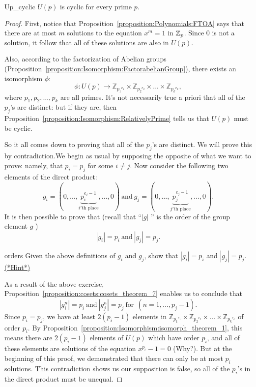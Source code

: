 \begin{prop}{Up_cyclic}
$U(p)$ is cyclic for every prime $p$.
\end {prop}
\begin{proof}
First, notice that Proposition~\ref{proposition:Polynomials:FTOA} says that there are at most $m$ solutions to the equation $x^m = 1$ in $\mathbb{Z}_p$. Since 0 is not a solution, it follow that all of these solutions are also in $U(p)$.

Also, according to the factorization of Abelian groups (Proposition~\ref{proposition:Isomorphism:FactorabelianGroup}), there exists an isomorphism $\phi$:
\[\phi: U(p)  \rightarrow {\mathbb{Z}_{{p_1}^{e_1}}}  \times   {\mathbb{Z}_{{p_2}^{e_2}}}  \times  ... \times   {\mathbb{Z}_{{p_k}^{e_k}}}, \]
where $p_1, p_2, \ldots, p_k$ are all primes.  It's not necessarily true a priori  that all of the $p_j$'s are distinct: but if they are, then Proposition~\ref{proposition:Isomorphism:RelativelyPrime} tells us that $U(p)$ must be cyclic. 

So it all comes down to proving that all of the $p_j$'s are distinct. We will prove this by contradiction.We begin as usual by supposing the opposite of what we want to prove: namely, that $p_i = p_j$ for some $i \neq j$. 
Now consider the following two elements of the direct product:
\[
g_i = ( 0, \ldots , \underbrace{p_i^{e_i-1}}_{i'\text{th place}}, \ldots,0) \mathrm{~ and ~} g_j = ( 0, \ldots , \underbrace{p_j^{e_j-1}}_{j'\text{th place}}, \ldots,0).
\]
It is then possible to prove that (recall that ``$|g|$ '' is the order of the group element $g$ )
\[ |g_i| = p_i \mathrm{~ and ~}  |g_j| = p_j. \]

\begin{exercise}{orders}
Given the above definitions of $g_i$ and $g_j$, show that   $|g_i| = p_i$ and  $|g_j| = p_j$.
\hyperref[sec:Polynomials:Hints]{(*Hint*)} 
\end{exercise}
As a result of the above exercise, Proposition~\ref{proposition:cosets:cosets_theorem_7}  enables us to conclude that 
\[
|g_i^n| = p_i \mathrm{~ and ~} |g_j^n| = p_j \mathrm{~ for~~} (n = 1,...,p_j-1).
\]
Since $p_i = p_j$, we have at least $2(p_i-1)$ elements in ${\mathbb{Z}_{{p_1}^{e_1}}}  \times   {\mathbb{Z}_{{p_2}^{e_2}}}  \times  ... \times   {\mathbb{Z}_{{p_k}^{e_k}}}$ of order $p_i$. By 
Proposition~\ref{proposition:Isomorphism:isomorph_theorem_1}, this means there are  $2(p_i-1)$ elements of $U(p)$ which have order $p_i$, and all of these elements are solutions of the equation $x^{p_i}-1=0$ (Why?). 
But at the beginning of this proof, we demonstrated that there can only be at most $p_i$ solutions. This contradiction shows us our supposition is false, so all of the $p_i$'s in the direct product must be unequal.
\end{proof}


